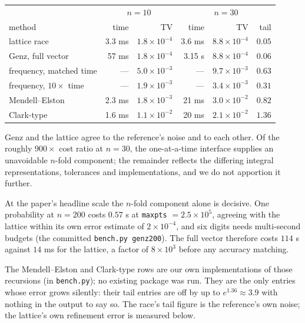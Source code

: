 \documentclass[11pt]{article}
\begin{document}
\begin{center}\small
\begin{tabular}{lrrrrr}
\toprule
& \multicolumn{2}{c}{$n=10$} & \multicolumn{3}{c}{$n=30$}\\
method & time & TV & time & TV & tail\\
\midrule
lattice race & 3.3 ms & $1.8\times10^{-4}$ & 3.6 ms & $8.8\times10^{-4}$ & $0.05$\\
Genz, full vector & 57 ms & $1.8\times10^{-4}$ & 3.15 s & $8.8\times10^{-4}$ & $0.06$\\
frequency, matched time & --- & $5.0\times10^{-3}$ & --- & $9.7\times10^{-3}$ & $0.63$\\
frequency, $10\times$ time & --- & $1.9\times10^{-3}$ & --- & $3.4\times10^{-3}$ & $0.31$\\
Mendell--Elston & 2.3 ms & $1.8\times10^{-3}$ & 21 ms & $3.0\times10^{-2}$ & $0.82$\\
Clark-type & 1.6 ms & $1.1\times10^{-2}$ & 20 ms & $2.1\times10^{-2}$ & $1.36$\\
\bottomrule
\end{tabular}
\end{center}

Genz and the lattice agree to the reference's noise and to each other.
Of the roughly $900\times$ cost ratio at $n=30$, the one-at-a-time interface
supplies an unavoidable $n$-fold component; the remainder reflects the
differing integral representations, tolerances and implementations, and
we do not apportion it further.

At the paper's headline scale the $n$-fold component alone is decisive.
One probability at $n=200$ costs $0.57$ s at \texttt{maxpts}
$=2.5\times10^{5}$, agreeing with the lattice within its own error
estimate of $2\times10^{-4}$, and
six digits needs multi-second budgets (the committed \texttt{bench.py
genz200}). The full vector therefore costs $114$ s against $14$ ms for the
lattice, a factor of $8\times10^{3}$ before any accuracy matching.

The Mendell--Elston and Clark-type rows are our own implementations of
those recursions (in \texttt{bench.py}); no existing package was run.
They are the only
entries whose error grows
silently: their tail entries are off by up to $e^{1.36}\approx3.9$ with nothing in
the output to say so. The race's tail figure is the reference's own
noise; the lattice's own refinement error is measured below.
\end{document}
